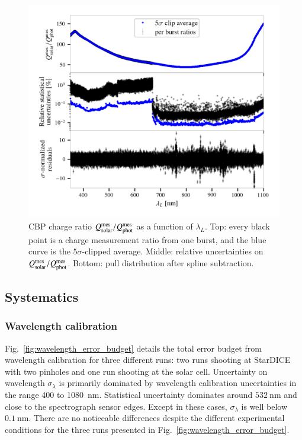 \begin{figure}%
\centering
\includegraphics[width=\columnwidth]{fig/cbp_charge_ratio.png}
\caption{CBP charge ratio $Q_{\mathrm{solar}}^{\mathrm{mes}}/Q_{\mathrm{phot}}^{\mathrm{mes}}$ as a function of $\lambda_L$. Top: every black point is a charge measurement ratio from one burst, and the blue curve is the $5\sigma$-clipped average. Middle: relative uncertainties on $Q_{\mathrm{solar}}^{\mathrm{mes}}/Q_{\mathrm{phot}}^{\mathrm{mes}}$. Bottom: pull distribution after spline subtraction.}\label{fig:cbp_charge_ratio}
\end{figure}


\subsection{Systematics}



\subsubsection{Wavelength calibration}\label{sec:wavelength_syst}


Fig.~\ref{fig:wavelength_error_budget} details the total error budget from wavelength calibration for three different runs: two runs shooting at StarDICE with two pinholes and one run shooting at the solar cell. Uncertainty on wavelength $\sigma_\lambda$ is primarily dominated by wavelength calibration uncertainties in the range 400 to \SI{1080}{\nm}. Statistical uncertainty dominates around $\SI{532}{\nm}$ and close to the spectrograph sensor edges. Except in these cases, $\sigma_\lambda$ is well below $\SI{0.1}{\nano\meter}$. There are no noticeable differences despite the different experimental conditions for the three runs presented in Fig.~\ref{fig:wavelength_error_budget}.

